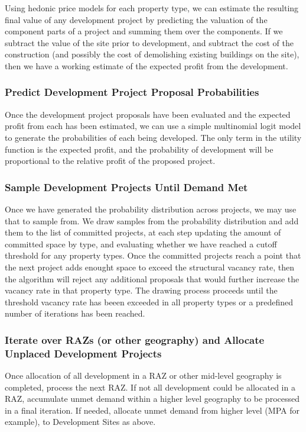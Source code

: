 Using hedonic price models for each property type, we can estimate the resulting final value of any
development project by predicting the valuation of the component parts of a project and summing them
over the components.  If we subtract the value of the site prior to development, and subtract the
cost of the construction (and possibly the cost of demolishing existing buildings on the site), then
we have a working estimate of the expected profit from the development.

\subsubsection{Predict Development Project Proposal Probabilities}
Once the development project proposals have been evaluated and the expected profit from each has been
estimated, we can use a simple multinomial logit model to generate the probabilities of each being
developed.  The only term in the utility function is the expected profit, and the probability of
development will be proportional to the relative profit of the proposed project.

\subsubsection{Sample Development Projects Until Demand Met}
Once we have generated the probability distribution across projects, we may use that to sample from.
We draw samples from the probability distribution and add them to the list of committed projects,
at each step updating the amount of committed space by type, and evaluating whether we have reached
a cutoff threshold for any property types.  Once the committed projects reach a point that the next
project adds enought space to exceed the structural vacancy rate, then the algorithm will reject any
additional proposals that would further increase the vacancy rate in that property type.  The drawing
process proceeds until the threshold vacancy rate has beeen exceeded in all property types or a
predefined number of iterations has been reached.

\subsubsection{Iterate over RAZs (or other geography) and Allocate Unplaced Development Projects}

Once allocation of all development in a RAZ or other mid-level geography is completed, process the
next RAZ. If not all development could be allocated in a RAZ, accumulate unmet demand within a higher
level geography to be processed in a final iteration. If needed, allocate unmet demand from higher
level (MPA for example), to Development Sites as above.

